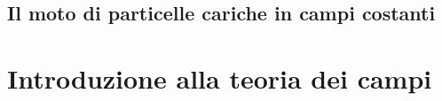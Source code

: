\documentclass[12pt,a4paper]{book}
\numberwithin{equation}{section}
\begin{document}
\begin{sloppypar}
\section{Il moto di particelle cariche in campi costanti}




\chapter{Introduzione alla teoria dei campi}





\appendix







\end{sloppypar}
\end{document}
